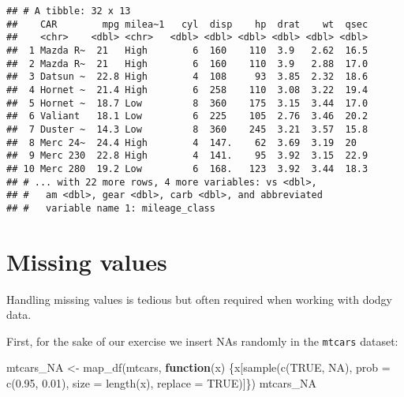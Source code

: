 \documentclass[
]{book}
\newenvironment{Shaded}{\begin{snugshade}}{\end{snugshade}}
\newcommand{\AttributeTok}[1]{\textcolor[rgb]{0.77,0.63,0.00}{#1}}
\newcommand{\ConstantTok}[1]{\textcolor[rgb]{0.00,0.00,0.00}{#1}}
\newcommand{\ControlFlowTok}[1]{\textcolor[rgb]{0.13,0.29,0.53}{\textbf{#1}}}
\newcommand{\FloatTok}[1]{\textcolor[rgb]{0.00,0.00,0.81}{#1}}
\newcommand{\FunctionTok}[1]{\textcolor[rgb]{0.00,0.00,0.00}{#1}}
\newcommand{\NormalTok}[1]{#1}
\newcommand{\OtherTok}[1]{\textcolor[rgb]{0.56,0.35,0.01}{#1}}
\begin{document}
\begin{verbatim}
## # A tibble: 32 x 13
##    CAR        mpg milea~1   cyl  disp    hp  drat    wt  qsec
##    <chr>    <dbl> <chr>   <dbl> <dbl> <dbl> <dbl> <dbl> <dbl>
##  1 Mazda R~  21   High        6  160    110  3.9   2.62  16.5
##  2 Mazda R~  21   High        6  160    110  3.9   2.88  17.0
##  3 Datsun ~  22.8 High        4  108     93  3.85  2.32  18.6
##  4 Hornet ~  21.4 High        6  258    110  3.08  3.22  19.4
##  5 Hornet ~  18.7 Low         8  360    175  3.15  3.44  17.0
##  6 Valiant   18.1 Low         6  225    105  2.76  3.46  20.2
##  7 Duster ~  14.3 Low         8  360    245  3.21  3.57  15.8
##  8 Merc 24~  24.4 High        4  147.    62  3.69  3.19  20  
##  9 Merc 230  22.8 High        4  141.    95  3.92  3.15  22.9
## 10 Merc 280  19.2 Low         6  168.   123  3.92  3.44  18.3
## # ... with 22 more rows, 4 more variables: vs <dbl>,
## #   am <dbl>, gear <dbl>, carb <dbl>, and abbreviated
## #   variable name 1: mileage_class
\end{verbatim}

\hypertarget{missing-values}{%
\section{Missing values}\label{missing-values}}

Handling missing values is tedious but often required when working with dodgy data.

First, for the sake of our exercise we insert NAs randomly in the \texttt{mtcars} dataset:

\begin{Shaded}
\begin{Highlighting}[]
\NormalTok{mtcars\_NA }\OtherTok{\textless{}{-}} \FunctionTok{map\_df}\NormalTok{(mtcars, }\ControlFlowTok{function}\NormalTok{(x) }
\NormalTok{  \{x[}\FunctionTok{sample}\NormalTok{(}\FunctionTok{c}\NormalTok{(}\ConstantTok{TRUE}\NormalTok{, }\ConstantTok{NA}\NormalTok{), }\AttributeTok{prob =} \FunctionTok{c}\NormalTok{(}\FloatTok{0.95}\NormalTok{, }\FloatTok{0.01}\NormalTok{), }\AttributeTok{size =} \FunctionTok{length}\NormalTok{(x), }\AttributeTok{replace =} \ConstantTok{TRUE}\NormalTok{)]\})}
\NormalTok{mtcars\_NA}
\end{Highlighting}
\end{Shaded}
\end{document}
